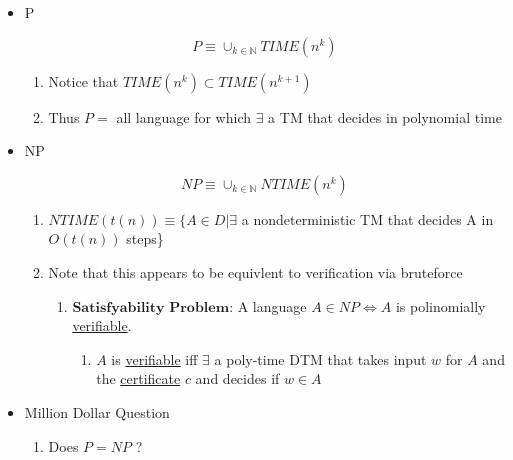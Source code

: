 \documentclass[11pt]{article}
\begin{document}
\begin{itemize}

\item P\\
\label{sec-7.2.1.1}

     \begin{equation}
     P \equiv \cup_{k\in \mathbb{N}} TIME(n^k)
     \end{equation}
\begin{enumerate}
\item Notice that $TIME(n^k) \subset TIME(n^{k+1})$
\item Thus $P =$ all language for which $\exists$ a TM that decides
        in polynomial time
\end{enumerate}

\item NP\\
\label{sec-7.2.1.2}

     \begin{equation}
     NP \equiv \cup_{k\in \mathbb{N}} NTIME(n^k)
     \end{equation}
\begin{enumerate}
\item $NTIME(t(n)) \equiv \{A\in D | \exists$ a nondeterministic TM
        that decides A in $O(t(n))$ steps\}
\item Note that this appears to be equivlent to verification via bruteforce

\begin{enumerate}
\item $\textbf{Satisfyability Problem}$:
           A language $A\in NP \iff A$ is polinomially \underline{verifiable}.

\begin{enumerate}
\item $A$ is \underline{verifiable} iff $\exists$ a poly-time DTM that
              takes input $w$ for $A$ and the \underline{certificate} $c$ and
              decides if $w \in A$
\end{enumerate}

\end{enumerate}

\end{enumerate}

\item Million Dollar Question\\
\label{sec-7.2.1.3}

\begin{enumerate}
\item Does $P=NP$ ?
\end{enumerate}


\end{itemize}
\end{document}
